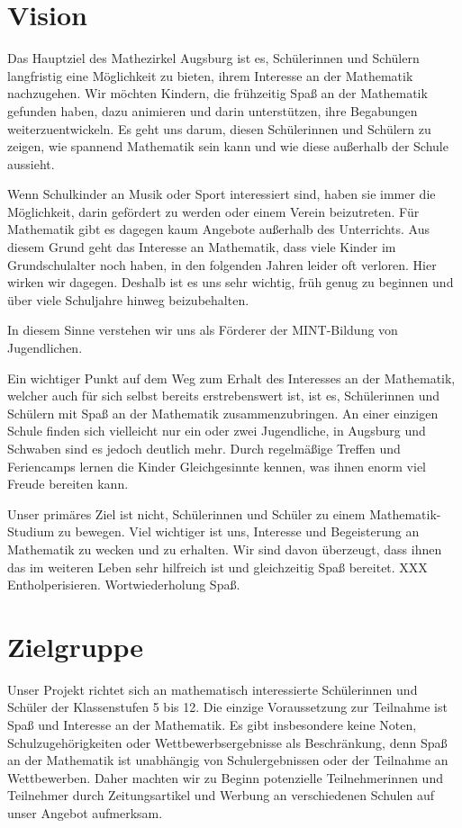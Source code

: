 \documentclass[12pt]{zettel}
\begin{document}
\section{Vision}

Das Hauptziel des Mathezirkel Augsburg ist es, Schülerinnen und Schülern
langfristig eine Möglichkeit zu bieten, ihrem Interesse an der
Mathematik nachzugehen. Wir möchten Kindern, die frühzeitig Spaß an der
Mathematik gefunden haben, dazu animieren und darin unterstützen, ihre
Begabungen weiterzuentwickeln.
Es geht uns darum, diesen Schülerinnen und
Schülern zu zeigen, wie spannend Mathematik sein kann und wie diese außerhalb der Schule aussieht. 

Wenn Schulkinder an Musik oder Sport interessiert sind, haben sie immer die
Möglichkeit, darin gefördert zu werden oder einem Verein beizutreten. Für
Mathematik gibt es dagegen kaum Angebote außerhalb des Unterrichts. Aus diesem
Grund geht das Interesse an Mathematik, dass viele Kinder im Grundschulalter
noch haben, in den folgenden Jahren leider oft verloren. Hier wirken wir
dagegen. Deshalb ist es uns sehr wichtig, früh genug zu beginnen und über viele
Schuljahre hinweg beizubehalten.

In diesem Sinne verstehen wir uns als Förderer der MINT-Bildung von
Jugendlichen.

Ein wichtiger Punkt auf dem Weg zum Erhalt des Interesses an der
Mathematik, welcher auch für sich selbst bereits erstrebenswert ist, ist es,
Schülerinnen und Schülern mit Spaß an der Mathematik zusammenzubringen.
An einer einzigen Schule finden sich vielleicht
nur ein oder zwei Jugendliche, in Augsburg und Schwaben sind es jedoch
deutlich mehr. Durch regelmäßige Treffen und Feriencamps lernen die
Kinder Gleichgesinnte kennen, was ihnen enorm viel Freude bereiten kann.

Unser primäres Ziel ist nicht, Schülerinnen und Schüler zu einem
Mathematik-Studium zu bewegen. Viel wichtiger ist uns, Interesse und
Begeisterung an Mathematik zu wecken und zu erhalten. Wir sind davon
überzeugt, dass ihnen das im weiteren Leben sehr hilfreich ist und gleichzeitig
Spaß bereitet. XXX Entholperisieren. Wortwiederholung Spaß.


\section{Zielgruppe}

Unser Projekt richtet sich an mathematisch interessierte Schülerinnen
und Schüler der Klassenstufen 5 bis 12. Die einzige Voraussetzung zur
Teilnahme ist Spaß und Interesse an der Mathematik. Es gibt insbesondere
keine Noten, Schulzugehörigkeiten oder Wettbewerbsergebnisse als
Beschränkung, denn Spaß an der Mathematik
ist unabhängig von Schulergebnissen oder der Teilnahme an
Wettbewerben. Daher machten wir zu Beginn potenzielle Teilnehmerinnen und
Teilnehmer durch Zeitungsartikel und Werbung an verschiedenen Schulen
auf unser Angebot aufmerksam.
\end{document}
